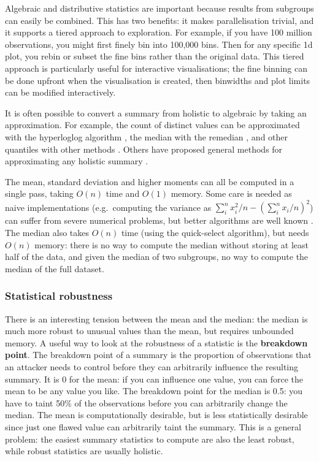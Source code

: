 \documentclass[journal]{vgtc}                %
\begin{document}
Algebraic and distributive statistics are important because results from subgroups can easily be combined. This has two benefits: it makes parallelisation trivial, and it supports a tiered approach to exploration. For example, if you have 100 million observations, you might first finely bin into 100,000 bins. Then for any specific 1d plot, you rebin or subset the fine bins rather than the original data. This tiered approach is particularly useful for interactive visualisations; the fine binning can be done upfront when the visualisation is created, then binwidths and plot limits can be modified interactively.

It is often possible to convert a summary from holistic to algebraic by taking an approximation. For example, the count of distinct values can be approximated with the hyperloglog algorithm \citep{flajolet:2007}, the median with the remedian \citep{rousseeuw:1990}, and other quantiles with other methods \citep{finkelstein:1994,hurley:1995,liechty:2003}. Others have proposed general methods for approximating any holistic summary \citep{christmann:2007}.

The mean, standard deviation and higher moments can all be computed in a single pass, taking $O(n)$ time and $O(1)$ memory. Some care is needed as naive implementations (e.g.\ computing the variance as $\sum_i^n x_i^2 / n - \left( \sum_i^n x_i / n \right)^2$) can suffer from severe numerical problems, but better algorithms are well known \citep{welford:1962}. The median also takes $O(n)$ time (using the quick-select algorithm), but needs $O(n)$ memory: there is no way to compute the median without storing at least half of the data, and given the median of two subgroups, no way to compute the median of the full dataset.

\subsubsection{Statistical robustness}

There is an interesting tension between the mean and the median: the median is much more robust to unusual values than the mean, but requires unbounded memory. A useful way to look at the robustness of a statistic is the {\bf breakdown point}. The breakdown point of a summary is the proportion of observations that an attacker needs to control before they can arbitrarily influence the resulting summary. It is 0 for the mean: if you can influence one value, you can force the mean to be any value you like. The breakdown point for the median is 0.5: you have to taint 50\% of the observations before you can arbitrarily change the median. The mean is computationally desirable, but is less statistically desirable since just one flawed value can arbitrarily taint the summary. This is a general problem: the easiest summary statistics to compute are also the least robust, while robust statistics are usually holistic.
\end{document}
